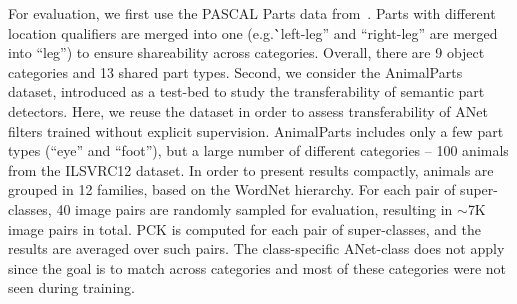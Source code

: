 \documentclass[10pt,twocolumn,letterpaper]{article}
\def\methodname{ANet\xspace}
\begin{document}
For evaluation, we first use the PASCAL Parts \cite{chen2014detect} data from~\cite{zhou15flowweb}. Parts with different location qualifiers are merged into one (e.g.\``left-leg'' and ``right-leg'' are merged into ``leg'') to ensure shareability across categories. Overall, there are 9 object categories and 13 shared part types. 
Second, we consider the AnimalParts~\cite{novotny16i-have} dataset, introduced as a test-bed to study the transferability of semantic part detectors. %
Here, we reuse the dataset in order to assess transferability of \methodname filters trained without explicit supervision. 
AnimalParts includes only a few part types (``eye'' and ``foot''), but a large number of different categories -- 100 animals from the ILSVRC12 dataset. In order to present results compactly, animals are grouped in 12 families, based on the WordNet \cite{Miller1995} hierarchy. For each pair of super-classes, 40 image pairs are randomly sampled for evaluation, resulting in $\sim$7K image pairs in total. PCK is computed for each pair of super-classes, and the results are averaged over such pairs. The class-specific \methodname-class does not apply since the goal is to match across categories and most of these categories were not seen during training.
\end{document}
